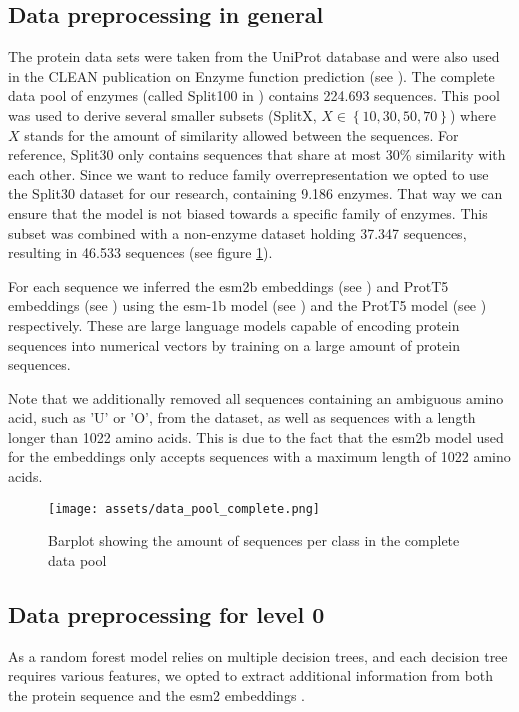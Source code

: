 \documentclass{bioinfo}
\begin{document}
\begin{methods}
\subsection{Data preprocessing in general}

The protein data sets were taken from the UniProt database and were also used in the CLEAN publication on Enzyme function prediction (see \cite{CleanArticle}). 
The complete data pool of enzymes (called Split100 in \cite{CLEANgit}) contains 224.693 sequences. 
This pool was used to derive several smaller subsets (SplitX, $X \in \left\{10, 30, 50, 70\right\}$) where $X$ stands for the amount of similarity allowed between the sequences.
For reference, Split30 only contains sequences that share at most 30\% similarity with each other.
Since we want to reduce family overrepresentation we opted to use the Split30 dataset for our research,
containing 9.186 enzymes. That way we can ensure that the model is not biased towards a specific family of enzymes.
This subset was combined with a non-enzyme dataset holding 37.347 sequences, resulting in 46.533 sequences (see figure \ref{fig:DataPoolDist}).

For each sequence we inferred the esm2b embeddings (see \cite{ESM2}) and ProtT5 embeddings (see \cite{ProtT5}) 
using the esm-1b model (see 
) and the ProtT5 model (see \cite{ProtT5}) respectively.
These are large language models capable of encoding protein sequences into numerical vectors
by training on a large amount of protein sequences. 




Note that we additionally removed all sequences containing an ambiguous amino acid, such as 'U' or 'O', from the dataset, as well as
sequences with a length longer than 1022 amino acids. 
This is due to the fact that the esm2b model used for the embeddings only accepts sequences 
with a maximum length of 1022 amino acids. 

\begin{figure}[!htbp]
\texttt{[image: assets/data\_pool\_complete.png]}
\caption{Barplot showing the amount of sequences per class in the complete data pool}\label{fig:DataPoolDist}
\end{figure}

\subsection{Data preprocessing for level 0}
As a random forest model relies on multiple decision trees, and each decision tree requires various features,
we opted to extract additional information from both the protein sequence and the esm2 embeddings \cite{ESM2}.


\end{methods}
\end{document}
